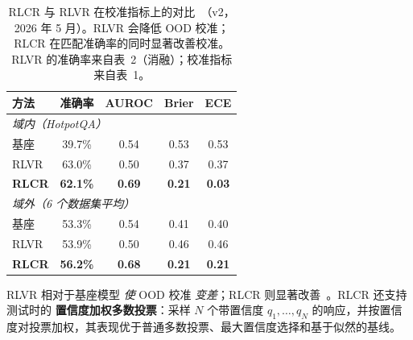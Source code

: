 \begin{table}[ht!]
\centering
\caption{RLCR 与 RLVR 在校准指标上的对比~\cite{damani2025rlcr}（v2，2026 年 5 月）。RLVR 会降低 OOD 校准；RLCR 在匹配准确率的同时显著改善校准。RLVR 的准确率来自表~2（消融）；校准指标来自表~1。}
{\small
\begin{tabular}{@{}lcccc@{}}
\toprule
\textbf{方法} & \textbf{准确率} & \textbf{AUROC} & \textbf{Brier} & \textbf{ECE} \\
\midrule
\multicolumn{5}{l}{\textit{域内（HotpotQA）}} \\
基座 & 39.7\% & 0.54 & 0.53 & 0.53 \\
RLVR & 63.0\% & 0.50 & 0.37 & 0.37 \\
\textbf{RLCR} & \textbf{62.1\%} & \textbf{0.69} & \textbf{0.21} & \textbf{0.03} \\
\midrule
\multicolumn{5}{l}{\textit{域外（6 个数据集平均）}} \\
基座 & 53.3\% & 0.54 & 0.41 & 0.40 \\
RLVR & 53.9\% & 0.50 & 0.46 & 0.46 \\
\textbf{RLCR} & \textbf{56.2\%} & \textbf{0.68} & \textbf{0.21} & \textbf{0.21} \\
\bottomrule
\end{tabular}
}
\end{table}

RLVR 相对于基座模型 \emph{使} OOD 校准 \emph{变差}；RLCR 则显著改善~\cite{damani2025rlcr}。RLCR 还支持测试时的 \textbf{置信度加权多数投票}：采样 $N$ 个带置信度 $q_1,\ldots,q_N$ 的响应，并按置信度对投票加权，其表现优于普通多数投票、最大置信度选择和基于似然的基线。

